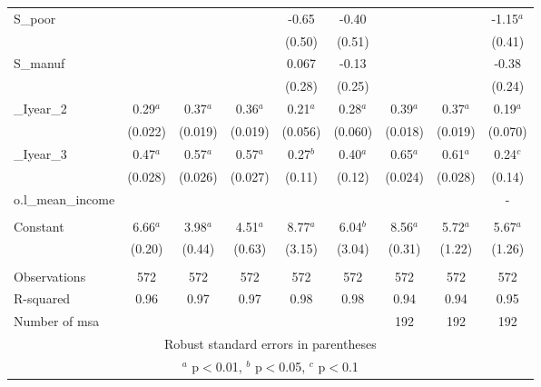 \documentclass[]{article}
\begin{document}
\begin{tabular}{lcccccccc}
S\_poor &  &  &  & -0.65 & -0.40 &  &  & -1.15$^a$ \\
 &  &  &  & (0.50) & (0.51) &  &  & (0.41) \\
S\_manuf &  &  &  & 0.067 & -0.13 &  &  & -0.38 \\
 &  &  &  & (0.28) & (0.25) &  &  & (0.24) \\
\_Iyear\_2 & 0.29$^a$ & 0.37$^a$ & 0.36$^a$ & 0.21$^a$ & 0.28$^a$ & 0.39$^a$ & 0.37$^a$ & 0.19$^a$ \\
 & (0.022) & (0.019) & (0.019) & (0.056) & (0.060) & (0.018) & (0.019) & (0.070) \\
\_Iyear\_3 & 0.47$^a$ & 0.57$^a$ & 0.57$^a$ & 0.27$^b$ & 0.40$^a$ & 0.65$^a$ & 0.61$^a$ & 0.24$^c$ \\
 & (0.028) & (0.026) & (0.027) & (0.11) & (0.12) & (0.024) & (0.028) & (0.14) \\
o.l\_mean\_income &  &  &  &  &  &  &  & - \\
 &  &  &  &  &  &  &  &  \\
Constant & 6.66$^a$ & 3.98$^a$ & 4.51$^a$ & 8.77$^a$ & 6.04$^b$ & 8.56$^a$ & 5.72$^a$ & 5.67$^a$ \\
 & (0.20) & (0.44) & (0.63) & (3.15) & (3.04) & (0.31) & (1.22) & (1.26) \\
 &  &  &  &  &  &  &  &  \\
Observations & 572 & 572 & 572 & 572 & 572 & 572 & 572 & 572 \\
R-squared & 0.96 & 0.97 & 0.97 & 0.98 & 0.98 & 0.94 & 0.94 & 0.95 \\
 Number of msa &  &  &  &  &  & 192 & 192 & 192 \\ \hline
\multicolumn{9}{c}{ Robust standard errors in parentheses} \\
\multicolumn{9}{c}{ $^a$ p$<$0.01, $^b$ p$<$0.05, $^c$ p$<$0.1} \\
\end{tabular}
\end{document}
